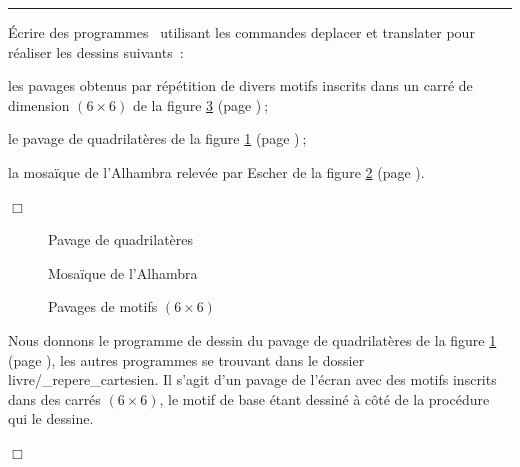 \noindent \rule{137mm}{0.1mm} %
\begin{exercices}{Écrire des programmes \python\  utilisant les commandes
{\idt de\-pla\-cer} et {\idt translater} pour réaliser les dessins suivants~:

\tiret  les pavages obtenus par répétition de divers motifs inscrits dans un carré de
dimension $(6 \times 6)$ de la figure \ref{fig:pm6x6} (page \pageref{fig:pm6x6})$\:$;

\tiret  le pavage de quadrilatères de la figure \ref{fig:pavqua} (page \pageref{fig:pavqua})$\:$;

\tiret  la mosaïque de l'Alhambra relevée par Escher \cite{escher1} de la figure 
\ref{fig:mosa5} (page \pageref{fig:mosa5}).

\noindent $\Box$}\end{exercices}
\begin{figure}[htbp]
 \caption{Pavage de quadrilatères}\label{fig:pavqua}
\end{figure}
\begin{figure}[htbp]
 \caption{Mosaïque de l'Alhambra}\label{fig:mosa5}
\end{figure}
\begin{figure}[htbp]
 \caption{Pavages de motifs $(6 \times 6)$}\label{fig:pm6x6}
\end{figure}
\begin{corrige}{
Nous donnons le programme de dessin du pavage de quadrilatères de la figure \ref{fig:pavqua} (page 
\pageref{fig:pavqua}), les autres programmes se trouvant dans le dossier {\idt livre/\_repere\_cartesien}. Il s'agit d'un pavage de
l'écran avec des motifs inscrits dans des carrés $(6 \times 6)$, le motif de base étant
dessiné à côté de la procédure qui le dessine.

\noindent $\Box$}\end{corrige}
\vfill

